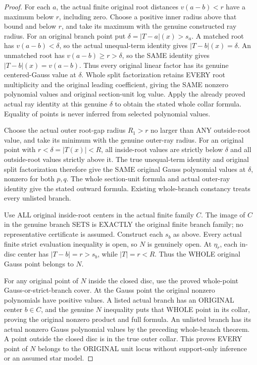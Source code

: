 \begin{proof}
For each $a$, the actual finite original root distances $v(a-b)<r$ have a
maximum below $r$, including zero. Choose a positive inner radius above
that bound and below $r$, and take its maximum with the genuine constructed ray radius. For an original branch point put
$\delta=|T-a|(x)>s_a$. A matched root has $v(a-b)<\delta$, so the actual
unequal-term identity gives $|T-b|(x)=\delta$. An unmatched root has
$v(a-b)\ge r>\delta$, so the SAME identity gives
$|T-b|(x)=v(a-b)$. Thus every original linear factor has its genuine
centered-Gauss value at $\delta$. Whole split factorization retains EVERY
root multiplicity and the original leading coefficient, giving the SAME
nonzero polynomial values and original section-unit log value. Apply the
already proved actual ray identity at this genuine $\delta$ to obtain the
stated whole collar formula. Equality of points is never inferred from
selected polynomial values.

Choose the actual outer root-gap radius $R_1>r$ no larger than ANY
outside-root value, and take its minimum with the genuine outer-ray radius.
For an original point with $r<\delta=|T(x)|<R$, all inside-root values are
strictly below $\delta$ and all outside-root values strictly above it.
The true unequal-term identity and original split factorization therefore
give the SAME original Gauss polynomial values at $\delta$, nonzero for
both $p,q$. The whole section-unit formula and actual outer-ray identity
give the stated outward formula. Existing whole-branch constancy treats
every unlisted branch.

Use ALL original inside-root centers in the actual finite family $C$.
The image of $C$ in the genuine branch SETS is EXACTLY the original finite
branch family; no representative certificate is assumed. Construct each
$s_b$ as above. Every actual finite strict evaluation inequality is open,
so $N$ is genuinely open. At $\eta_r$, each in-disc center has
$|T-b|=r>s_b$, while $|T|=r<R$. Thus the WHOLE original Gauss point
belongs to $N$.

For any original point of $N$ inside the closed disc, use the proved
whole-point Gauss-or-strict-branch cover. At the Gauss point the original
nonzero polynomials have positive values. A listed actual branch has an
ORIGINAL center $b\in C$, and the genuine $N$ inequality puts that WHOLE
point in its collar, proving the original nonzero product and full formula.
An unlisted branch has its actual nonzero Gauss polynomial values by the
preceding whole-branch theorem. A point outside the closed disc is in the
true outer collar. This proves EVERY point of $N$ belongs to the ORIGINAL
unit locus without support-only inference or an assumed star model.
\end{proof}


